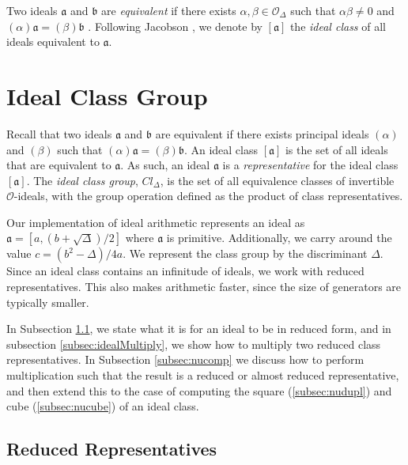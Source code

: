 \documentclass{ucalgthes1}
\theoremstyle{definition}
\newcommand{\OO}{\mathcal{O}}
\begin{document}
Two ideals $\mathfrak a$ and $\mathfrak b$ are \emph{equivalent} if there exists $\alpha, \beta \in \OO_\Delta$ such that $\alpha \beta \neq 0$ and $(\alpha)\mathfrak a = (\beta) \mathfrak b$ \cite[p.88]{Jacobson2009}. Following Jacobson \cite[p.88]{Jacobson2009}, we denote by $[\mathfrak a]$ the \emph{ideal class} of all ideals equivalent to $\mathfrak a$. 


\bigbreak
\section{Ideal Class Group}

Recall that two ideals $\mathfrak a$ and $\mathfrak b$ are equivalent if there exists principal ideals $(\alpha)$ and $(\beta)$ such that $(\alpha)\mathfrak a = (\beta)\mathfrak b$.  An ideal class $[\mathfrak a]$ is the set of all ideals that are equivalent to $\mathfrak a$. As such, an ideal $\mathfrak a$ is a \emph{representative} for the ideal class $[\mathfrak a]$. The \emph{ideal class group}, $Cl_\Delta$, is the set of all equivalence classes of invertible $\OO$-ideals, with the group operation defined as the product of class representatives.

Our implementation of ideal arithmetic represents an ideal as $\mathfrak a = [a, (b + \sqrt\Delta)/2]$ where $\mathfrak a$ is primitive.  Additionally, we carry around the value $c = (b^2 - \Delta)/4a$.  We represent the class group by the discriminant $\Delta$. Since an ideal class contains an infinitude of ideals, we work with reduced representatives.  This also makes arithmetic faster, since the size of generators are typically smaller.

In Subsection \ref{subsec:reduction}, we state what it is for an ideal to be in reduced form, and in subsection \ref{subsec:idealMultiply}, we show how to multiply two reduced class representatives. In Subsection \ref{subsec:nucomp} we discuss how to perform multiplication such that the result is a reduced or almost reduced representative, and then extend this to the case of computing the square (\ref{subsec:nudupl}) and cube (\ref{subsec:nucube}) of an ideal class.  


\subsection{Reduced Representatives}
\label{subsec:reduction}
\end{document}
